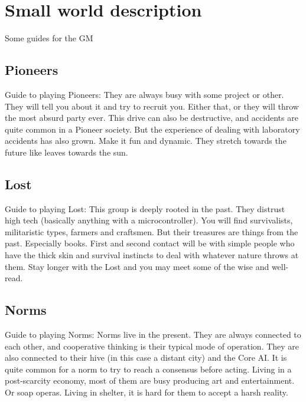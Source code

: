 
\chapter{Small world description}

Some guides for the GM

\section{Pioneers}
\label{sec:Pioneers}
Guide to playing Pioneers: They are always busy with some project or other. They will tell you about it and try to recruit you. Either that, or they will throw the most absurd party ever. This drive can also be destructive, and accidents are quite common in a Pioneer society. But the experience of dealing with laboratory accidents has also grown.
Make it fun and dynamic.
They stretch towards the future like leaves towards the sun.

\section{Lost}
\label{sec:Lost}
Guide to playing Lost: This group is deeply rooted in the past. They distrust high tech (basically anything with a microcontroller). You will find survivalists, militaristic types, farmers and craftsmen. But their treasures are things from the past. Especially books.
First and second contact will be with simple people who have the thick skin and survival instincts to deal with whatever nature throws at them. Stay longer with the Lost and you may meet some of the wise and well-read.


\section{Norms}
\label{sec:Norms}
Guide to playing Norms: Norms live in the present. They are always connected to each other, and cooperative thinking is their typical mode of operation. They are also connected to their hive (in this case a distant city) and the Core AI.
It is quite common for a norm to try to reach a consensus before acting.
Living in a post-scarcity economy, most of them are busy producing art and entertainment. Or soap operas. Living in shelter, it is hard for them to accept a harsh reality.


